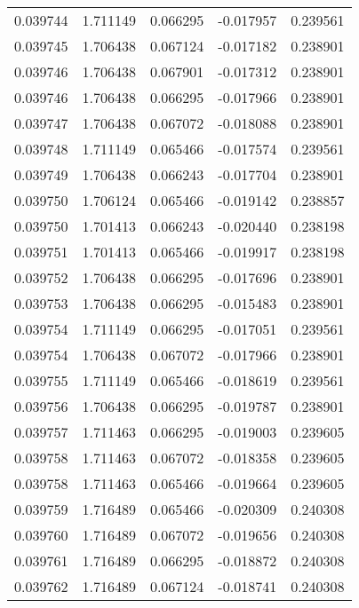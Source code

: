 \begin{tabular}{lrrrr}
0.039744    &  1.711149 &  0.066295 & -0.017957 &             0.239561 \\
0.039745    &  1.706438 &  0.067124 & -0.017182 &             0.238901 \\
0.039746    &  1.706438 &  0.067901 & -0.017312 &             0.238901 \\
0.039746    &  1.706438 &  0.066295 & -0.017966 &             0.238901 \\
0.039747    &  1.706438 &  0.067072 & -0.018088 &             0.238901 \\
0.039748    &  1.711149 &  0.065466 & -0.017574 &             0.239561 \\
0.039749    &  1.706438 &  0.066243 & -0.017704 &             0.238901 \\
0.039750    &  1.706124 &  0.065466 & -0.019142 &             0.238857 \\
0.039750    &  1.701413 &  0.066243 & -0.020440 &             0.238198 \\
0.039751    &  1.701413 &  0.065466 & -0.019917 &             0.238198 \\
0.039752    &  1.706438 &  0.066295 & -0.017696 &             0.238901 \\
0.039753    &  1.706438 &  0.066295 & -0.015483 &             0.238901 \\
0.039754    &  1.711149 &  0.066295 & -0.017051 &             0.239561 \\
0.039754    &  1.706438 &  0.067072 & -0.017966 &             0.238901 \\
0.039755    &  1.711149 &  0.065466 & -0.018619 &             0.239561 \\
0.039756    &  1.706438 &  0.066295 & -0.019787 &             0.238901 \\
0.039757    &  1.711463 &  0.066295 & -0.019003 &             0.239605 \\
0.039758    &  1.711463 &  0.067072 & -0.018358 &             0.239605 \\
0.039758    &  1.711463 &  0.065466 & -0.019664 &             0.239605 \\
0.039759    &  1.716489 &  0.065466 & -0.020309 &             0.240308 \\
0.039760    &  1.716489 &  0.067072 & -0.019656 &             0.240308 \\
0.039761    &  1.716489 &  0.066295 & -0.018872 &             0.240308 \\
0.039762    &  1.716489 &  0.067124 & -0.018741 &             0.240308 \\

\end{tabular}
